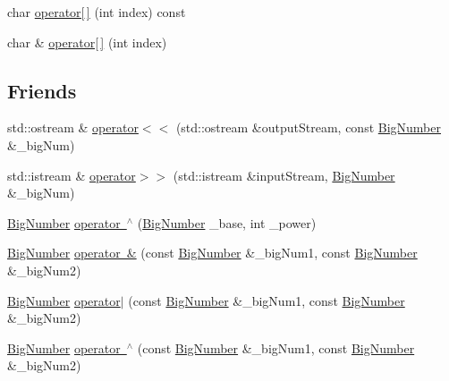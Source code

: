 \textbf{ }\par
\begin{DoxyCompactItemize}
\item 
char \mbox{\hyperlink{class_big_nums_1_1_big_number_ab3ebd73a1b9d6719be452f05f9e2ebce}{operator\mbox{[}$\,$\mbox{]}}} (int index) const
\item 
char \& \mbox{\hyperlink{class_big_nums_1_1_big_number_aa341f4a148c2d83057ccd78f7a048c41}{operator\mbox{[}$\,$\mbox{]}}} (int index)
\end{DoxyCompactItemize}

\subsection*{Friends}
\begin{DoxyCompactItemize}
\item 
std\+::ostream \& \mbox{\hyperlink{class_big_nums_1_1_big_number_a47e2ad103bf98d5fecb7a0ff01d36e60}{operator$<$$<$}} (std\+::ostream \&output\+Stream, const \mbox{\hyperlink{class_big_nums_1_1_big_number}{Big\+Number}} \&\+\_\+big\+Num)
\item 
std\+::istream \& \mbox{\hyperlink{class_big_nums_1_1_big_number_adda5cd1a7aca6683ef84866af7e5bd0b}{operator$>$$>$}} (std\+::istream \&input\+Stream, \mbox{\hyperlink{class_big_nums_1_1_big_number}{Big\+Number}} \&\+\_\+big\+Num)
\item 
\mbox{\hyperlink{class_big_nums_1_1_big_number}{Big\+Number}} \mbox{\hyperlink{class_big_nums_1_1_big_number_a0f9a8bcbc50de75e11d114a8c8629896}{operator $^\wedge$}} (\mbox{\hyperlink{class_big_nums_1_1_big_number}{Big\+Number}} \+\_\+base, int \+\_\+power)
\item 
\mbox{\hyperlink{class_big_nums_1_1_big_number}{Big\+Number}} \mbox{\hyperlink{class_big_nums_1_1_big_number_a177683ba51aeb898d01c71f978e7b437}{operator \&}} (const \mbox{\hyperlink{class_big_nums_1_1_big_number}{Big\+Number}} \&\+\_\+big\+Num1, const \mbox{\hyperlink{class_big_nums_1_1_big_number}{Big\+Number}} \&\+\_\+big\+Num2)
\item 
\mbox{\hyperlink{class_big_nums_1_1_big_number}{Big\+Number}} \mbox{\hyperlink{class_big_nums_1_1_big_number_a20db44e73666375cb56579d951ef87c4}{operator$\vert$}} (const \mbox{\hyperlink{class_big_nums_1_1_big_number}{Big\+Number}} \&\+\_\+big\+Num1, const \mbox{\hyperlink{class_big_nums_1_1_big_number}{Big\+Number}} \&\+\_\+big\+Num2)
\item 
\mbox{\hyperlink{class_big_nums_1_1_big_number}{Big\+Number}} \mbox{\hyperlink{class_big_nums_1_1_big_number_a2e3512db297a67899d84f57ba0ec31f5}{operator $^\wedge$}} (const \mbox{\hyperlink{class_big_nums_1_1_big_number}{Big\+Number}} \&\+\_\+big\+Num1, const \mbox{\hyperlink{class_big_nums_1_1_big_number}{Big\+Number}} \&\+\_\+big\+Num2)

\end{DoxyCompactItemize}
